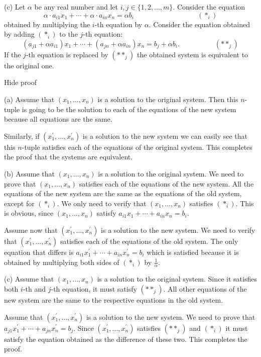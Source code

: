     (c) Let \( \alpha \) be any real number and let \( i,j\in\{1,2,\dots, m\} \). Consider the equation \[ \alpha\cdot a_{i1}x_1+\cdots+\alpha\cdot a_{in}x_n=\alpha b_i\quad\quad\quad\quad\quad\quad\quad\quad\quad (\ast_i)\] obtained by multiplying the \( i \)-th equation by \( \alpha \). Consider the equation obtained by adding \( (\ast_i) \) to the \( j \)-th equation: \[ \left(a_{j1}+\alpha a_{i1}\right)x_1+\cdots + \left(a_{jn}+\alpha a_{in}\right)x_n=b_j+\alpha b_i. \quad\quad\quad\quad\quad (\ast\ast_j)\] If the \( j \)-th equation is replaced by \( (\ast\ast_j) \) the obtained system is equivalent to the original one.

Hide proof

    (a) Assume that \( (x_1, \dots, x_n) \) is a solution to the original system. Then this \( n \)-tuple is going to be the solution to each of the equations of the new system because all equations are the same.

    Similarly, if \( (x^{\prime}_1, \dots, x^{\prime}_n) \) is a solution to the new system we can easily see that this \( n \)-tuple satisfies each of the equations of the original system. This completes the proof that the systems are equivalent.

    (b) Assume that \( (x_1, \dots, x_n) \) is a solution to the original system. We need to prove that \( (x_1,\dots, x_n) \) satisfies each of the equations of the new system. All the equations of the new system are the same as the equations of the old system, except for \( (\ast_i) \). We only need to verify that \( (x_1, \dots, x_n) \) satisfies \( (\ast_i) \). This is obvious, since \( (x_1, \dots, x_n) \) satisfy \( a_{i1}x_1+\cdots+a_{in}x_n=b_i \).

    Assume now that \( (x^{\prime}_1, \dots, x^{\prime}_n) \) is a solution to the new system. We need to verify that \( (x^{\prime}_1, \dots, x^{\prime}_n) \) satisfies each of the equations of the old system. The only equation that differs is \( a_{i1}x^{\prime}_1+\cdots+a_{in}x^{\prime}_n=b_i \) which is satisfied because it is obtained by multiplying both sides of \( (\ast_i) \) by \( \frac1{\alpha} \).

    (c) Assume that \( (x_1, \dots, x_n) \) is a solution to the original system. Since it satisfies both \( i \)-th and \( j \)-th equation, it must satisfy \( (\ast\ast_j) \). All other equations of the new system are the same to the respective equations in the old system.

    Assume that \( (x_1^{\prime}, \dots, x_n^{\prime}) \) is a solution to the new system. We need to prove that \( a_{j1}x^{\prime}_1+\cdots + a_{jn}x^{\prime}_n=b_j \). Since \( (x^{\prime}_1, \dots, x^{\prime}_n) \) satisfies \( (\ast\ast_j) \) and \( (\ast_i) \) it must satisfy the equation obtained as the difference of these two. This completes the proof.

